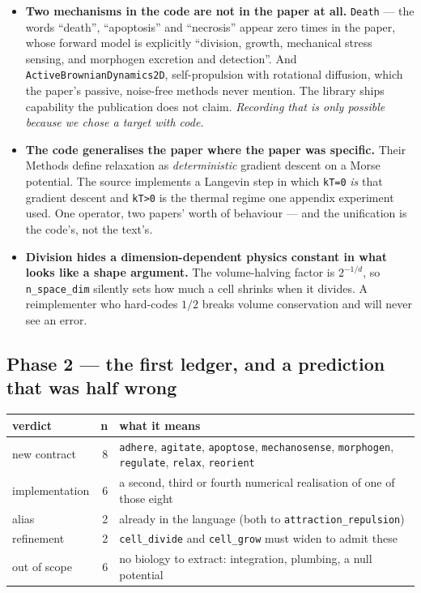 \documentclass[11pt,a4paper]{article}
\newcommand{\code}[1]{\texttt{#1}}
\begin{document}
\begin{itemize}
\item \textbf{Two mechanisms in the code are not in the paper at all.} \code{Death} --- the words
``death'', ``apoptosis'' and ``necrosis'' appear zero times in the paper, whose forward model is
explicitly ``division, growth, mechanical stress sensing, and morphogen excretion and detection''.
And \code{ActiveBrownianDynamics2D}, self-propulsion with rotational diffusion, which the paper's
passive, noise-free methods never mention. The library ships capability the publication does not
claim. \emph{Recording that is only possible because we chose a target with code.}
\item \textbf{The code generalises the paper where the paper was specific.} Their Methods define
relaxation as \emph{deterministic} gradient descent on a Morse potential. The source implements a
Langevin step in which \code{kT=0} \emph{is} that gradient descent and \code{kT>0} is the thermal
regime one appendix experiment used. One operator, two papers' worth of behaviour --- and the
unification is the code's, not the text's.
\item \textbf{Division hides a dimension-dependent physics constant in what looks like a shape
argument.} The volume-halving factor is $2^{-1/d}$, so \code{n\_space\_dim} silently sets how much
a cell shrinks when it divides. A reimplementer who hard-codes $1/2$ breaks volume conservation
and will never see an error.
\end{itemize}

\subsection{Phase 2 --- the first ledger, and a prediction that was half wrong}

\begin{center}
\small
\begin{tabular}{@{}l r p{8.6cm}@{}}
\toprule
\textbf{verdict} & \textbf{n} & \textbf{what it means}\\
\midrule
new contract & 8 & \code{adhere}, \code{agitate}, \code{apoptose}, \code{mechanosense},
\code{morphogen}, \code{regulate}, \code{relax}, \code{reorient}\\
implementation & 6 & a second, third or fourth numerical realisation of one of those eight\\
alias & 2 & already in the language (both to \code{attraction\_repulsion})\\
refinement & 2 & \code{cell\_divide} and \code{cell\_grow} must widen to admit these\\
out of scope & 6 & no biology to extract: integration, plumbing, a null potential\\
\bottomrule
\end{tabular}
\end{center}
\end{document}
